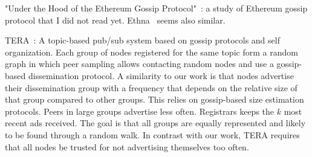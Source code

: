 "Under the Hood of the Ethereum Gossip Protocol"~\cite{kiffer2021under}: a study of Ethereum gossip protocol that I did not read yet.
Ethna~\cite{wang2021ethna} seems also similar.

TERA~\cite{baldoni2007tera}: A topic-based pub/sub system based on gossip protocols and self organization. Each group of nodes registered for the same topic form a random graph in which peer sampling allows contacting random nodes and use a gossip-based dissemination protocol. A similarity to our work is that nodes advertise their dissemination group with a frequency that depends on the relative size of that group compared to other groups. This relies on gossip-based size estimation protocols. Peers in large groups advertise less often. Registrars keeps the $k$ most recent ads received. The goal is that all groups are equally represented and likely to be found through a random walk. In contrast with our work, TERA requires that all nodes be trusted for not advertising themselves too often.
